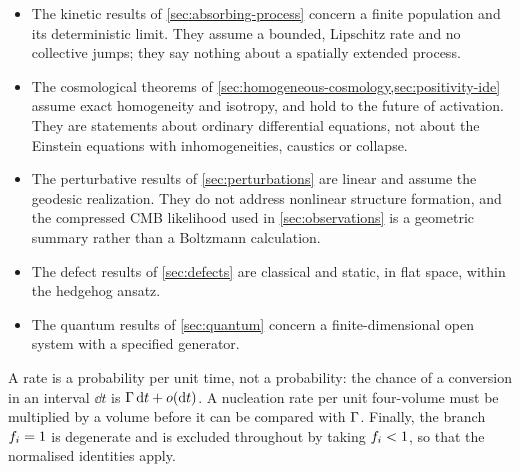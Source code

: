 \begin{itemize}
  \item The kinetic results of \cref{sec:absorbing-process} concern a
    finite population and its deterministic limit. They assume a bounded,
    Lipschitz rate and no collective jumps; they say nothing about a spatially
    extended process.
  \item The cosmological theorems of
    \cref{sec:homogeneous-cosmology,sec:positivity-ide} assume exact homogeneity
    and isotropy, and hold to the future of activation. They are statements
    about ordinary differential equations, not about the Einstein equations
    with inhomogeneities, caustics or collapse.
  \item The perturbative results of \cref{sec:perturbations} are linear and
    assume the geodesic realization. They do not address nonlinear structure
    formation, and the compressed CMB likelihood used in
    \cref{sec:observations} is a geometric summary rather than a Boltzmann
    calculation.
  \item The defect results of \cref{sec:defects} are classical and static, in
    flat space, within the hedgehog ansatz.
  \item The quantum results of \cref{sec:quantum} concern a finite-dimensional
    open system with a specified generator.
\end{itemize}

A rate is a probability per unit time, not a probability: the chance of a
conversion in an interval $\dd t$ is $\Gamma\,\mathrm{d} t+o(\mathrm{d} t)$. A nucleation rate
per unit four-volume must be multiplied by a volume before it can be compared
with $\Gamma$. Finally, the branch $f_i=1$ is degenerate and is excluded
throughout by taking $f_i<1$, so that the normalised identities apply.

